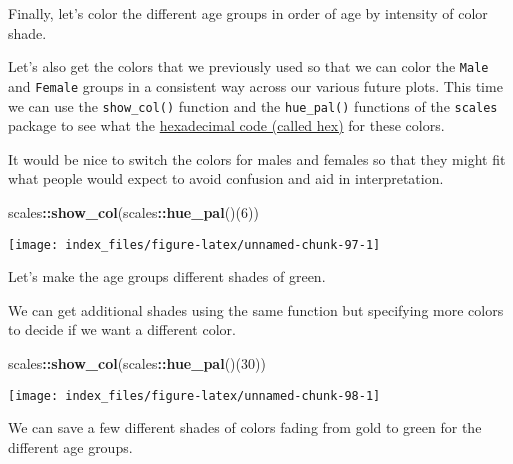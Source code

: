 \documentclass[
]{article}
\newenvironment{Shaded}{\begin{snugshade}}{\end{snugshade}}
\newcommand{\DecValTok}[1]{\textcolor[rgb]{0.00,0.00,0.81}{#1}}
\newcommand{\KeywordTok}[1]{\textcolor[rgb]{0.13,0.29,0.53}{\textbf{#1}}}
\newcommand{\NormalTok}[1]{#1}
\newcommand{\OperatorTok}[1]{\textcolor[rgb]{0.81,0.36,0.00}{\textbf{#1}}}
\newcommand{\StringTok}[1]{\textcolor[rgb]{0.31,0.60,0.02}{#1}}
\begin{document}
Finally, let's color the different age groups in order of age by
intensity of color shade.

Let's also get the colors that we previously used so that we can color
the \texttt{Male} and \texttt{Female} groups in a consistent way across
our various future plots. This time we can use the \texttt{show\_col()}
function and the \texttt{hue\_pal()} functions of the \texttt{scales}
package to see what the
\href{https://en.wikipedia.org/wiki/Web_colors}{hexadecimal code (called
hex)} for these colors.

It would be nice to switch the colors for males and females so that they
might fit what people would expect to avoid confusion and aid in
interpretation.

\begin{Shaded}
\begin{Highlighting}[]
\NormalTok{scales}\OperatorTok{::}\KeywordTok{show_col}\NormalTok{(scales}\OperatorTok{::}\KeywordTok{hue_pal}\NormalTok{()(}\DecValTok{6}\NormalTok{))}
\end{Highlighting}
\end{Shaded}

\begin{center}\texttt{[image: index\_files/figure-latex/unnamed-chunk-97-1]} \end{center}

Let's make the age groups different shades of green.

We can get additional shades using the same function but specifying more
colors to decide if we want a different color.

\begin{Shaded}
\begin{Highlighting}[]
\NormalTok{scales}\OperatorTok{::}\KeywordTok{show_col}\NormalTok{(scales}\OperatorTok{::}\KeywordTok{hue_pal}\NormalTok{()(}\DecValTok{30}\NormalTok{))}
\end{Highlighting}
\end{Shaded}

\begin{center}\texttt{[image: index\_files/figure-latex/unnamed-chunk-98-1]} \end{center}

We can save a few different shades of colors fading from gold to green
for the different age groups.

\begin{Shaded}
\end{Shaded}
\end{document}
